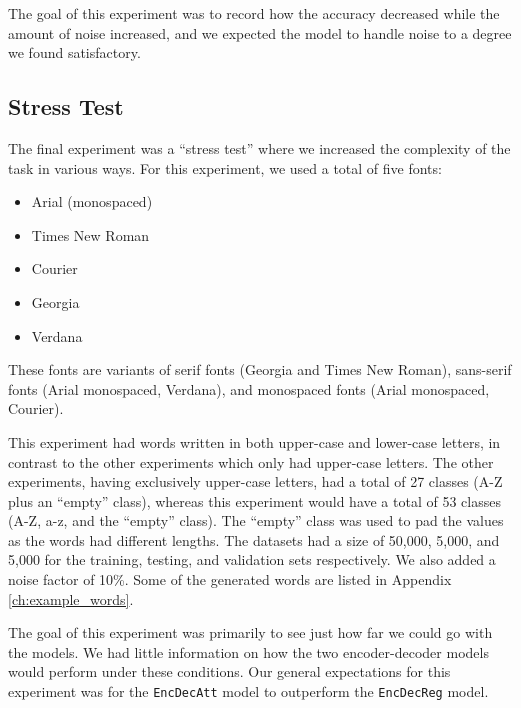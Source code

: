 The goal of this experiment was to record how the accuracy decreased while the amount of noise increased, and we expected the model to handle noise to a degree we found satisfactory.

\subsection{Stress Test}
The final experiment was a ``stress test'' where we increased the complexity of the task in various ways. For this experiment, we used a total of five fonts:

\begin{itemize}
    \item Arial (monospaced)
    \item Times New Roman
    \item Courier
    \item Georgia
    \item Verdana
\end{itemize}

These fonts are variants of serif fonts (Georgia and Times New Roman), sans-serif fonts (Arial monospaced, Verdana), and monospaced fonts (Arial monospaced, Courier).

This experiment had words written in both upper-case and lower-case letters, in contrast to the other experiments which only had upper-case letters. The other experiments, having exclusively upper-case letters, had a total of 27 classes (A-Z plus an ``empty'' class), whereas this experiment would have a total of 53 classes (A-Z, a-z, and the ``empty'' class). The ``empty'' class was used to pad the values as the words had different lengths. The datasets had a size of 50,000, 5,000, and 5,000 for the training, testing, and validation sets respectively. We also added a noise factor of 10\%. Some of the generated words are listed in Appendix \ref{ch:example_words}.

The goal of this experiment was primarily to see just how far we could go with the models. We had little information on how the two encoder-decoder models would perform under these conditions. Our general expectations for this experiment was for the {\tt EncDecAtt} model to outperform the {\tt EncDecReg} model.